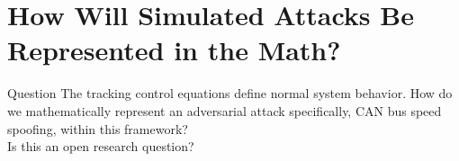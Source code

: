 \section{How Will Simulated Attacks Be Represented in the Math?}

\begin{questionbox}{Question}
	The tracking control equations define normal system behavior.
	How do we mathematically represent an adversarial attack specifically,
	CAN bus speed spoofing, within this framework? \\
	Is this an open research question?
\end{questionbox}
